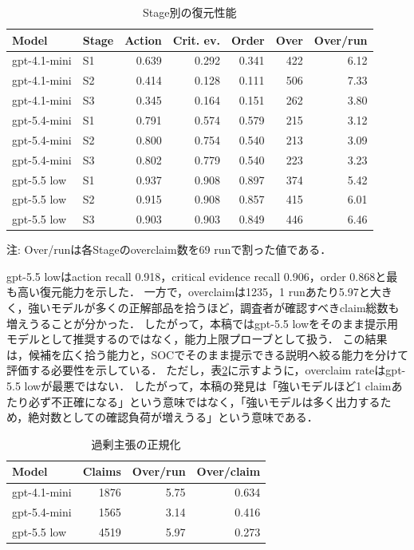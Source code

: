 \documentclass[a4paper,twocolumn,10pt]{article}
\newcommand{\code}[1]{{\small\ttfamily #1}}
\begin{document}
\begin{table}[t]
\centering
\footnotesize
\caption{Stage別の復元性能}
\label{tab:stage_result}
\setlength{\tabcolsep}{5pt}
\begin{tabular}{@{}llrrrrr@{}}
\toprule
Model & Stage & Action & Crit. ev. & Order & Over & Over/run \\
\midrule
\code{gpt-4.1-mini} & S1 & 0.639 & 0.292 & 0.341 & 422 & 6.12 \\
\code{gpt-4.1-mini} & S2 & 0.414 & 0.128 & 0.111 & 506 & 7.33 \\
\code{gpt-4.1-mini} & S3 & 0.345 & 0.164 & 0.151 & 262 & 3.80 \\
\code{gpt-5.4-mini} & S1 & 0.791 & 0.574 & 0.579 & 215 & 3.12 \\
\code{gpt-5.4-mini} & S2 & 0.800 & 0.754 & 0.540 & 213 & 3.09 \\
\code{gpt-5.4-mini} & S3 & 0.802 & 0.779 & 0.540 & 223 & 3.23 \\
\midrule
\code{gpt-5.5 low} & S1 & 0.937 & 0.908 & 0.897 & 374 & 5.42 \\
\code{gpt-5.5 low} & S2 & 0.915 & 0.908 & 0.857 & 415 & 6.01 \\
\code{gpt-5.5 low} & S3 & 0.903 & 0.903 & 0.849 & 446 & 6.46 \\
\bottomrule
\end{tabular}
\par\raggedright\scriptsize 注: Over/runは各Stageのoverclaim数を69 runで割った値である．
\end{table}


\code{gpt-5.5 low}はaction recall 0.918，critical evidence recall 0.906，order 0.868と最も高い復元能力を示した．
一方で，overclaimは1235，1 runあたり5.97と大きく，強いモデルが多くの正解部品を拾うほど，調査者が確認すべきclaim総数も増えうることが分かった．
したがって，本稿では\code{gpt-5.5 low}をそのまま提示用モデルとして推奨するのではなく，能力上限プローブとして扱う．
この結果は，候補を広く拾う能力と，SOCでそのまま提示できる説明へ絞る能力を分けて評価する必要性を示している．
ただし，表\ref{tab:overclaim_rate}に示すように，overclaim rateは\code{gpt-5.5 low}が最悪ではない．
したがって，本稿の発見は「強いモデルほど1 claimあたり必ず不正確になる」という意味ではなく，「強いモデルは多く出力するため，絶対数としての確認負荷が増えうる」という意味である．

\begin{table}[t]
\centering
\footnotesize
\caption{過剰主張の正規化}
\label{tab:overclaim_rate}
\setlength{\tabcolsep}{2pt}
\begin{tabular}{@{}lrrr@{}}
\toprule
Model & Claims & Over/run & Over/claim \\
\midrule
\code{gpt-4.1-mini} & 1876 & 5.75 & 0.634 \\
\code{gpt-5.4-mini} & 1565 & 3.14 & 0.416 \\
\code{gpt-5.5 low} & 4519 & 5.97 & 0.273 \\
\bottomrule
\end{tabular}
\end{table}
\end{document}
